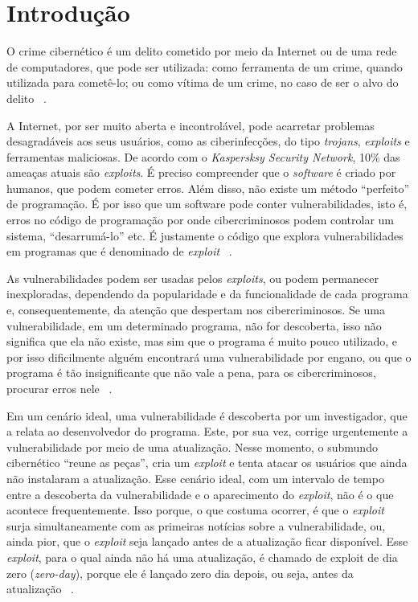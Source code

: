 \section{Introdução}
O crime cibernético é um delito cometido por meio da Internet ou de uma rede de computadores, que pode ser utilizada: como ferramenta de um crime, quando utilizada para cometê-lo; ou como vítima de um crime, no caso de ser o alvo do delito ~\cite{Fotiet:2015}. 

A Internet, por ser muito aberta e incontrolável, pode acarretar problemas desagradáveis aos seus usuários, como as ciberinfecções, do tipo \textit{trojans}, \textit{exploits} e ferramentas maliciosas. De acordo com o \textit{Kaspersksy Security Network}, 10\% das ameaças atuais são \textit{exploits}. É preciso compreender que o \textit{software} é criado por humanos, que podem cometer erros. Além disso, não existe um método “perfeito” de programação. É por isso que um software pode conter vulnerabilidades, isto é, erros no código de programação por onde cibercriminosos podem controlar um sistema, “desarrumá-lo” etc. É justamente o código que explora vulnerabilidades em programas que é denominado de \textit{exploit} ~\cite{Kaspersky:2012}.

As vulnerabilidades podem ser usadas pelos \textit{exploits}, ou podem permanecer inexploradas, dependendo da popularidade e da funcionalidade de cada programa e, consequentemente, da atenção que despertam nos cibercriminosos. Se uma vulnerabilidade, em um determinado programa, não for descoberta, isso não significa que ela não existe, mas sim que o programa é muito pouco utilizado, e por isso dificilmente alguém encontrará uma vulnerabilidade por engano, ou que o programa é tão insignificante que não vale a pena, para os cibercriminosos, procurar erros nele ~\cite{Kaspersky:2012}.

Em um cenário ideal, uma vulnerabilidade é descoberta por um investigador, que a relata ao desenvolvedor do programa. Este, por sua vez, corrige urgentemente a vulnerabilidade por meio de uma atualização. Nesse momento, o submundo cibernético “reune as peças”, cria um \textit{exploit} e tenta atacar os usuários que ainda não instalaram a atualização. Esse cenário ideal, com um intervalo de tempo entre a descoberta da vulnerabilidade e o aparecimento do \textit{exploit}, não é o que acontece frequentemente. Isso porque, o que costuma ocorrer, é que o \textit{exploit} surja simultaneamente com as primeiras notícias sobre a vulnerabilidade, ou, ainda pior, que o \textit{exploit} seja lançado antes de a atualização ficar disponível. Esse \textit{exploit}, para o qual ainda não há uma atualização, é chamado de exploit de dia zero (\textit{zero-day}), porque ele é lançado zero dia depois, ou seja, antes da atualização ~\cite{Kaspersky:2012}.

